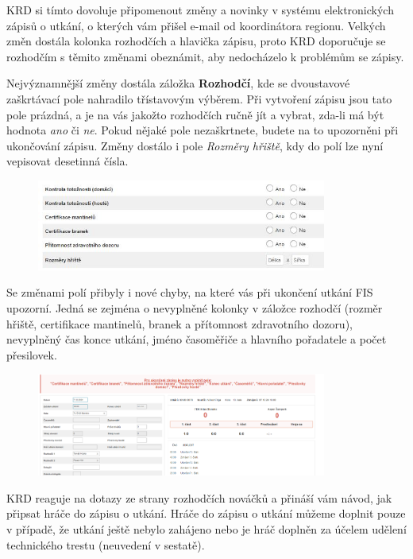 \documentclass{newsletter_2025}
\begin{document}
\clearpage
{}

KRD si tímto dovoluje připomenout změny a novinky v systému elektronických zápisů o utkání, o kterých vám přišel e-mail od koordinátora regionu. Velkých změn dostála kolonka rozhodčích a hlavička zápisu, proto KRD doporučuje se rozhodčím s těmito změnami obeznámit, aby nedocházelo k problémům se zápisy.

Nejvýznamnější změny dostála záložka \textbf{Rozhodčí}, kde se dvoustavové zaškrtávací pole nahradilo třístavovým výběrem. Při vytvoření zápisu jsou tato pole prázdná, a je na vás jakožto rozhodčích ručně jít a vybrat, zda-li má být hodnota \textit{ano} či \textit{ne}. Pokud nějaké pole nezaškrtnete, budete na to upozorněni při ukončování zápisu. Změny dostálo i pole \textit{Rozměry hřiště}, kdy do polí lze nyní vepisovat desetinná čísla.

\begin{figure}[h]
	\centering
	\includegraphics[width=0.85\textwidth, keepaspectratio]{nevyplneny_rozhodci}
\end{figure}

Se změnami polí přibyly i nové chyby, na které vás při ukončení utkání FIS upozorní. Jedná se zejména o nevyplněné kolonky v záložce rozhodčí (rozměr hřiště, certifikace mantinelů, branek a přítomnost zdravotního dozoru), nevyplněný čas konce utkání, jméno časoměřiče a hlavního pořadatele a počet přesilovek.

\begin{figure}[h]
	\centering
	\includegraphics[width=0.85\textwidth, keepaspectratio]{nove_kontroly}
\end{figure}

\clearpage
{}
KRD reaguje na dotazy ze strany rozhodčích nováčků a přináší vám návod, jak připsat hráče do zápisu o utkání. Hráče do zápisu o utkání můžeme doplnit pouze v případě, že utkání ještě nebylo zahájeno nebo je hráč doplněn za účelem udělení technického trestu (neuvedení v sestatě).
\end{document}
